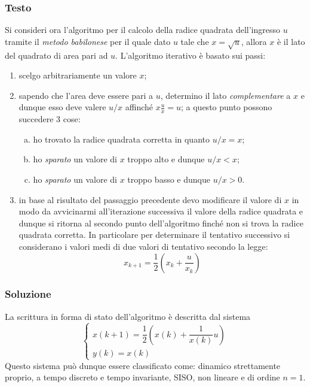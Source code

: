 	\subsubsection{Testo}
		Si consideri ora l'algoritmo per il calcolo della radice quadrata dell'ingresso $u$ tramite il \textit{metodo babilonese} per il quale dato $u$ tale che $x=\sqrt u$, allora $x$ è il lato del quadrato di area pari ad $u$. L'algoritmo iterativo è basato sui passi:
		\begin{enumerate}
			\item scelgo arbitrariamente un valore $x$;
			\item sapendo che l'area deve essere pari a $u$, determino il lato \textit{complementare} a $x$ e dunque esso deve valere $u/x$ affinché $x \frac u x = u$; a questo punto possono succedere 3 cose: 
			\begin{enumerate}[a)]
				\item ho trovato la radice quadrata corretta in quanto $u/x=x$;
				\item ho \textit{sparato} un valore di $x$ troppo alto e dunque $u/x < x$;
				\item ho \textit{sparato} un valore di $x$ troppo basso e dunque $u/x > 0$.
			\end{enumerate}
			
			\item in base al risultato del passaggio precedente devo modificare il valore di $x$ in modo da avvicinarmi all'iterazione successiva il valore della radice quadrata e dunque si ritorna al secondo punto dell'algoritmo finché non si trova la radice quadrata corretta. In particolare per determinare il tentativo successivo si considerano i valori medi di due valori di tentativo secondo la legge:
			\[ x_{k+1} = \frac 1 2 \left(x_{k} + \frac u {x_k} \right)\]
		\end{enumerate}
	
	\subsubsection{Soluzione}	
		La scrittura in forma di stato dell'algoritmo è descritta dal sistema
		\[\begin{cases}
			x(k+1) = \dfrac 1 2 \left(x(k) + \dfrac 1 {x(k)} u\right) \\ y(k) = x(k)
		\end{cases}\]
		Questo sistema può dunque essere classificato come: dinamico strettamente proprio, a tempo discreto e tempo invariante, SISO, non lineare e di ordine $n=1$.

	
		
		
		
		
		
		
		
		
		
		
		
		
		
		
		
		
		
		
		
		
		
		